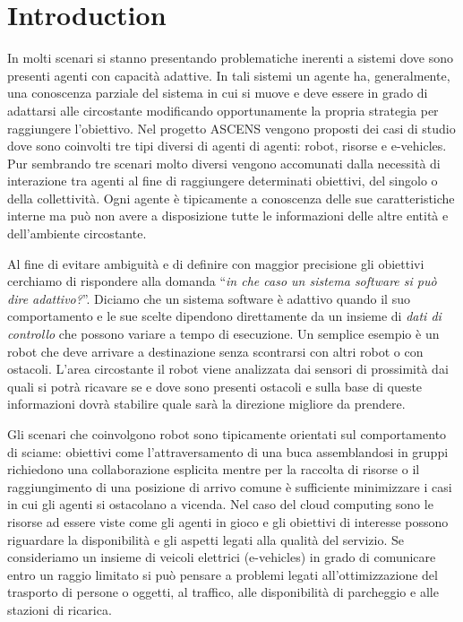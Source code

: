 \section{Introduction}
In molti scenari si stanno presentando problematiche inerenti a sistemi dove sono presenti agenti con capacità adattive. In tali sistemi un agente ha, generalmente, una conoscenza parziale del sistema in cui si muove e deve essere in grado di adattarsi alle circostante modificando opportunamente la propria strategia per raggiungere l'obiettivo. Nel progetto ASCENS %
vengono proposti dei casi di studio dove sono coinvolti tre tipi diversi di agenti di agenti: robot, risorse e e-vehicles. Pur sembrando tre scenari molto diversi vengono accomunati dalla necessità di interazione tra agenti al fine di raggiungere determinati obiettivi, del singolo o della collettività. Ogni agente è tipicamente a conoscenza delle sue caratteristiche interne ma può non avere a disposizione tutte le informazioni delle altre entità e dell'ambiente circostante.

Al fine di evitare ambiguità e di definire con maggior precisione gli obiettivi cerchiamo di rispondere alla domanda ``\emph{in che caso un sistema software si può dire adattivo?}''. %
Diciamo che un sistema software è adattivo quando il suo comportamento e le sue scelte dipendono direttamente da un insieme di \emph{dati di controllo} che possono variare a tempo di esecuzione. Un semplice esempio è un robot che deve arrivare a destinazione senza scontrarsi con altri robot o con ostacoli. L'area circostante il robot viene analizzata dai sensori di prossimità dai quali si potrà ricavare se e dove sono presenti ostacoli e sulla base di queste informazioni dovrà stabilire quale sarà la direzione migliore da prendere.

Gli scenari che coinvolgono robot sono tipicamente orientati sul comportamento di sciame: obiettivi come l'attraversamento di una buca %
assemblandosi in gruppi richiedono una collaborazione esplicita mentre per la raccolta di risorse %
o il raggiungimento di una posizione di arrivo comune è sufficiente minimizzare i casi in cui gli agenti si ostacolano a vicenda. Nel caso del cloud computing sono le risorse ad essere viste come gli agenti in gioco e gli obiettivi di interesse possono riguardare la disponibilità e gli aspetti legati alla qualità del servizio. Se consideriamo un insieme di veicoli elettrici (e-vehicles) in grado di comunicare entro un raggio limitato si può pensare a problemi legati all'ottimizzazione del trasporto di persone o oggetti, al traffico, alle disponibilità di parcheggio e alle stazioni di ricarica.

